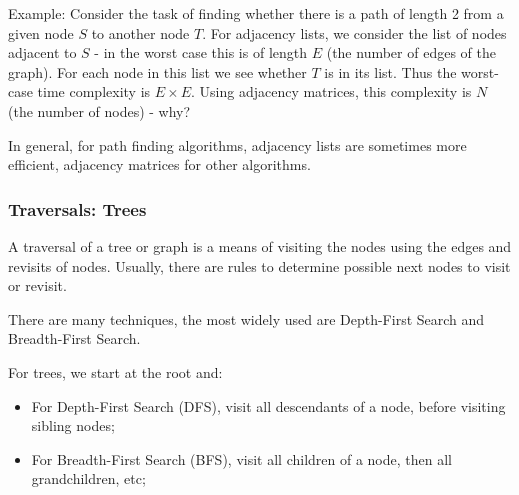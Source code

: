   \begin{frame}[fragile]

\color{blue}Example\color{black}: Consider the task of finding whether there is a path of length 2 from a given node
$S$ to another node $T$. For adjacency lists, we consider the list of nodes adjacent to
$S$ - in the worst case this is of length $E$ (the number of edges of the graph). For each node
in this list we see whether $T$ is in its list. Thus the worst-case time complexity is 
$E\times E$. Using adjacency matrices, this complexity is $N$ (the number of nodes) - why?

In general, for path finding algorithms, adjacency lists are sometimes more efficient, 
adjacency matrices for other algorithms.
\end{frame}

  \begin{frame}[fragile]
\frametitle{Traversals: Trees}

A traversal of a tree or graph is a means of visiting the nodes using the edges and
revisits of nodes. Usually, there are rules to determine possible next nodes to 
visit or revisit.

There are many techniques, the most widely used are \color{blue}Depth-First Search \color{black} and \color{blue}Breadth-First Search\color{black}.

For \color{red}trees\color{black}, we start at the root and: 

\begin{itemize}
\item For \color{blue}Depth-First Search \color{black} (DFS), visit all descendants of a node, before visiting sibling nodes;
\item For  \color{blue}Breadth-First Search \color{black} (BFS), visit all children of a node, then all grandchildren, etc;
\end {itemize}

\end{frame}

